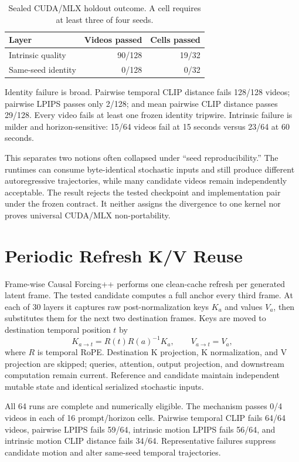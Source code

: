 \documentclass[10pt,twocolumn]{article}
\begin{document}
\begin{table}[t]
\centering
\caption{Sealed CUDA/MLX holdout outcome. A cell requires at least three of four seeds.}
\label{tab:crossruntime}
\small
\begin{tabular}{lrr}
\toprule
Layer & Videos passed & Cells passed \\
\midrule
Intrinsic quality & 90/128 & 19/32 \\
Same-seed identity & 0/128 & 0/32 \\
\bottomrule
\end{tabular}
\end{table}

Identity failure is broad. Pairwise temporal CLIP distance fails 128/128 videos; pairwise LPIPS passes only 2/128; and mean pairwise CLIP distance passes 29/128. Every video fails at least one frozen identity tripwire. Intrinsic failure is milder and horizon-sensitive: 15/64 videos fail at 15 seconds versus 23/64 at 60 seconds.

This separates two notions often collapsed under ``seed reproducibility.'' The runtimes can consume byte-identical stochastic inputs and still produce different autoregressive trajectories, while many candidate videos remain independently acceptable. The result rejects the tested checkpoint and implementation pair under the frozen contract. It neither assigns the divergence to one kernel nor proves universal CUDA/MLX non-portability.

\section{Periodic Refresh K/V Reuse}\label{sec:refresh}
Frame-wise Causal Forcing++ performs one clean-cache refresh per generated latent frame. The tested candidate computes a full anchor every third frame. At each of 30 layers it captures raw post-normalization keys $K_a$ and values $V_a$, then substitutes them for the next two destination frames. Keys are moved to destination temporal position $t$ by
\begin{equation}
K_{a\rightarrow t}=R(t)R(a)^{-1}K_a,\qquad V_{a\rightarrow t}=V_a,
\end{equation}
where $R$ is temporal RoPE. Destination K projection, K normalization, and V projection are skipped; queries, attention, output projection, and downstream computation remain current. Reference and candidate maintain independent mutable state and identical serialized stochastic inputs.

All 64 runs are complete and numerically eligible. The mechanism passes 0/4 videos in each of 16 prompt/horizon cells. Pairwise temporal CLIP fails 64/64 videos, pairwise LPIPS fails 59/64, intrinsic motion LPIPS fails 56/64, and intrinsic motion CLIP distance fails 34/64. Representative failures suppress candidate motion and alter same-seed temporal trajectories.
\end{document}
